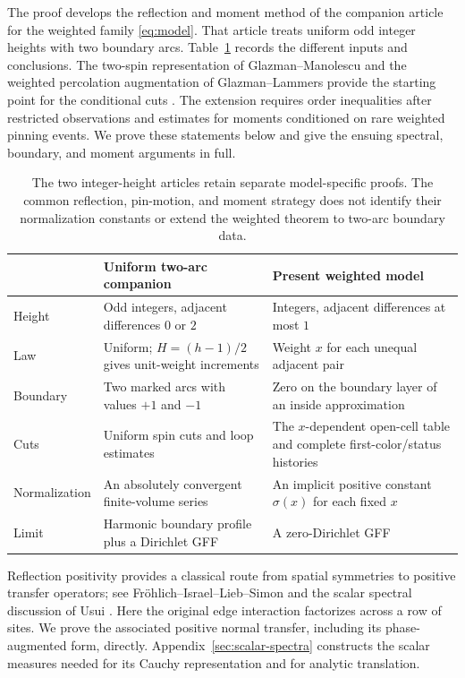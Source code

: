 \documentclass[11pt]{article}
\theoremstyle{definition}
\theoremstyle{remark}
\numberwithin{equation}{section}
\begin{document}
The proof develops the reflection and moment method of
the companion article \cite[Sections~5, 7, 9, and 10]{UniformIntegerGFF}
for the weighted family \eqref{eq:model}.  That article treats uniform
odd integer heights with two boundary arcs.  Table~\ref{tab:integer-models}
records the different inputs and conclusions.
The two-spin representation of Glazman--Manolescu and the weighted
percolation augmentation of Glazman--Lammers provide the starting point
for the conditional cuts \cite{GM2021,GL2025}.  The extension requires
order inequalities after restricted observations and estimates for
moments conditioned on rare weighted pinning events.  We prove these
statements below and give the ensuing spectral, boundary, and moment
arguments in full.

\begin{table}[!htbp]
\centering
\small
\renewcommand{\arraystretch}{1.22}
\begin{tabular}{p{}p{}p{}}
\hline
 & Uniform two-arc companion & Present weighted model \\
\hline
Height & Odd integers, adjacent differences $0$ or $2$ &
Integers, adjacent differences at most $1$ \\
Law & Uniform; $H=(h-1)/2$ gives unit-weight increments &
Weight $x$ for each unequal adjacent pair \\
Boundary & Two marked arcs with values $+1$ and $-1$ &
Zero on the boundary layer of an inside approximation \\
Cuts & Uniform spin cuts and loop estimates &
The $x$-dependent open-cell table and complete first-color/status histories \\
Normalization & An absolutely convergent finite-volume series &
An implicit positive constant $\sigma(x)$ for each fixed $x$ \\
Limit & Harmonic boundary profile plus a Dirichlet GFF &
A zero-Dirichlet GFF \\
\hline
\end{tabular}
\caption{The two integer-height articles retain separate model-specific
proofs.  The common reflection, pin-motion, and moment strategy does not
identify their normalization constants or extend the weighted theorem
to two-arc boundary data.}
\label{tab:integer-models}
\end{table}
\FloatBarrier

Reflection positivity provides a classical route from spatial symmetries
to positive transfer operators; see Fr\"ohlich--Israel--Lieb--Simon
\cite{FILS1978} and the scalar spectral discussion of Usui
\cite[Sections~3--4]{Usui2012}.  Here the original edge interaction
factorizes across a row of sites.  We prove the associated positive
normal transfer, including its phase-augmented form, directly.
Appendix~\ref{sec:scalar-spectra} constructs the scalar measures needed
for its Cauchy representation and for analytic translation.
\end{document}
